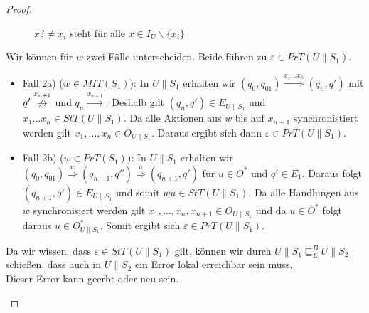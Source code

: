 \begin{proof}
\begin{itemize}
\begin{figure} [h!tbp]
\begin{center}
        \caption{$x?\neq x_i$ steht für alle $x\in I_U\backslash\{x_i\}$}
        \label{UohneE}
      \end{center}
      \end{figure}
      Wir können für $w$ zwei Fälle unterscheiden. Beide führen zu
      $\varepsilon\in PrT(U\|S_1)$.
      \begin{itemize}
        \item Fall 2a) ($w\in MIT(S_1)$): In $U\|S_1$ erhalten wir
          $(q_0,q_{01}) \overset{x_1\dots x_n}{\Rightarrow} (q_n,q')$ mit
          $q' \overset{x_{n+1}}{\not{\hspace{-0.1cm}\rightarrow}}$ und $q_n
          \overset{x_{n+1}}{\rightarrow}$. Deshalb gilt $(q_n,q')\in
          E_{U\|S_1}$ und $x_1\dots x_n\in StT(U\|S_1)$. Da alle Aktionen aus
          $w$ bis auf $x_{n+1}$ synchronistiert werden gilt $x_1,\dots ,x_n\in
          O_{U\|S_1}$. Daraus ergibt sich dann $\varepsilon\in PrT(U\|S_1)$.
        \item Fall 2b) ($w\in PrT(S_1)$): In $U\|S_1$ erhalten wir
          $(q_0,q_{01}) \overset{w}{\Rightarrow} (q_{n+1},q'')
          \overset{u}{\Rightarrow} (q_{n+1},q')$ für $u\in O^*$ und $q'\in
          E_1$. Daraus folgt $(q_{n+1},q')\in E_{U\|S_1}$ und somit $wu\in
          StT(U\|S_1)$. Da alle Handlungen aus $w$ synchronisiert werden gilt
          $x_1,\dots ,x_n,x_{n+1}\in O_{U\|S_1}$ und da $u\in O^*$ folgt
          daraus $u\in O_{U\|S_1}^*$. Somit ergibt sich $\varepsilon\in
          PrT(U\|S_1)$.
      \end{itemize}
      Da wir wissen, dass $\varepsilon\in StT(U\|S_1)$ gilt, können wir durch
      $U\|S_1\sqsubseteq _E^B U\|S_2$ schießen, dass auch in $U\|S_2$ ein Error
      lokal erreichbar sein muss.\\
      Dieser Error kann geerbt oder neu sein.\\
      \begin{itemize}

\end{itemize}
\end{itemize}
\end{proof}
